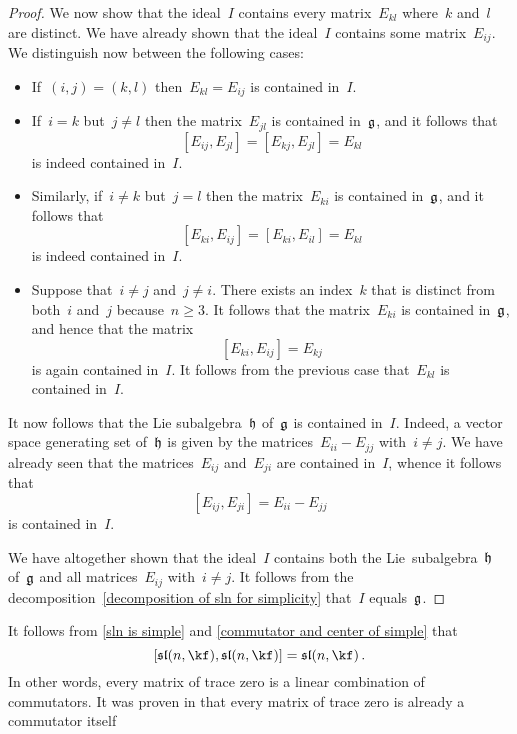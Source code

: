 \begin{proof}
	We now show that the ideal~$I$ contains every matrix~$E_{kl}$ where~$k$ and~$l$ are distinct.
	We have already shown that the ideal~$I$ contains some matrix~$E_{ij}$.
	We distinguish now between the following cases:
	\begin{itemize}
		\item
			If~$(i,j) = (k,l)$ then~$E_{kl} = E_{ij}$ is contained in~$I$.
		\item
			If~$i = k$ but~$j \neq l$ then the matrix~$E_{jl}$ is contained in~$\mathfrak{g}$, and it follows that
			\[
				[ E_{ij}, E_{jl} ]
				=
				[ E_{kj}, E_{jl} ]
				=
				E_{kl}
			\]
			is indeed contained in~$I$.
		\item
			Similarly, if~$i \neq k$ but~$j = l$ then the matrix~$E_{ki}$ is contained in~$\mathfrak{g}$, and it follows that
			\[
				[ E_{ki}, E_{ij} ]
				=
				[ E_{ki}, E_{il} ]
				=
				E_{kl}
			\]
			is indeed contained in~$I$.
		\item
			Suppose that~$i \neq j$ and~$j \neq i$.
			There exists an index~$k$ that is distinct from both~$i$ and~$j$ because~$n \geq 3$.
			It follows that the matrix~$E_{ki}$ is contained in~$\mathfrak{g}$, and hence that the matrix
			\[
				[E_{ki}, E_{ij}]
				=
				E_{kj}
			\]
			is again contained in~$I$.
			It follows from the previous case that~$E_{kl}$ is contained in~$I$.
	\end{itemize}
	It now follows that the Lie subalgebra~$\mathfrak{h}$ of~$\mathfrak{g}$ is contained in~$I$.
	Indeed, a vector space generating set of~$\mathfrak{h}$ is given by the matrices~$E_{ii} - E_{jj}$ with~$i \neq j$.
	We have already seen that the matrices~$E_{ij}$ and~$E_{ji}$ are contained in~$I$, whence it follows that
	\[
		[E_{ij}, E_{ji}]
		=
		E_{ii} - E_{jj}
	\]
	is contained in~$I$.

	We have altogether shown that the ideal~$I$ contains both the Lie~subalgebra~$\mathfrak{h}$ of~$\mathfrak{g}$ and all matrices~$E_{ij}$ with~$i \neq j$.
	It follows from the decomposition~\eqref{decomposition of sln for simplicity} that~$I$ equals~$\mathfrak{g}$.
\end{proof}


\begin{remark}
	It follows from \cref{sln is simple} and \cref{commutator and center of simple} that
	\[
		[\sllie(n, \kf), \sllie(n, \kf)]
		=
		\sllie(n, \kf) \,.
	\]
	In other words, every matrix of trace zero is a linear combination of commutators.
	It was proven in \cite{albert_muckenhoupt_matrices_trace_zero} that every matrix of trace zero is already a commutator itself
\end{remark}





